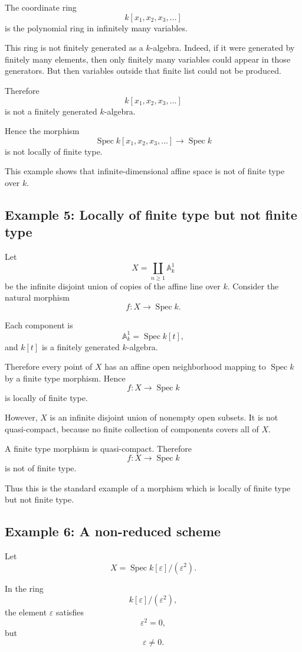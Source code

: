 \documentclass[12pt,a4paper]{article}
\theoremstyle{notespace}
\begin{document}
The coordinate ring
\[
k[x_1,x_2,x_3,\dots]
\]
is the polynomial ring in infinitely many variables.

This ring is not finitely generated as a \(k\)-algebra. Indeed, if it were generated by finitely many elements, then only finitely many variables could appear in those generators. But then variables outside that finite list could not be produced.

Therefore
\[
k[x_1,x_2,x_3,\dots]
\]
is not a finitely generated \(k\)-algebra.

Hence the morphism
\[
\operatorname{Spec} k[x_1,x_2,x_3,\dots]
\to
\operatorname{Spec} k
\]
is not locally of finite type.

This example shows that infinite-dimensional affine space is not of finite type over \(k\).

\subsection{Example 5: Locally of finite type but not finite type}

Let
\[
X=\coprod_{n\geq 1}\mathbb A_k^1
\]
be the infinite disjoint union of copies of the affine line over \(k\). Consider the natural morphism
\[
f:X\to \operatorname{Spec} k.
\]

Each component is
\[
\mathbb A_k^1=\operatorname{Spec} k[t],
\]
and \(k[t]\) is a finitely generated \(k\)-algebra.

Therefore every point of \(X\) has an affine open neighborhood mapping to \(\operatorname{Spec} k\) by a finite type morphism. Hence
\[
f:X\to \operatorname{Spec} k
\]
is locally of finite type.

However, \(X\) is an infinite disjoint union of nonempty open subsets. It is not quasi-compact, because no finite collection of components covers all of \(X\).

A finite type morphism is quasi-compact. Therefore
\[
f:X\to \operatorname{Spec} k
\]
is not of finite type.

Thus this is the standard example of a morphism which is locally of finite type but not finite type.

\subsection{Example 6: A non-reduced scheme}

Let
\[
X=\operatorname{Spec} k[\varepsilon]/(\varepsilon^2).
\]

In the ring
\[
k[\varepsilon]/(\varepsilon^2),
\]
the element \(\varepsilon\) satisfies
\[
\varepsilon^2=0,
\]
but
\[
\varepsilon\neq 0.
\]
\end{document}
